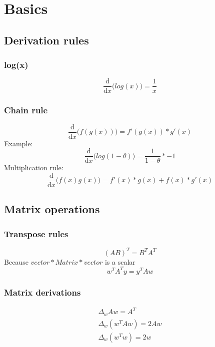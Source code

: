 \section{Basics}
\subsection{Derivation rules}
\subsubsection{log(x)}
\begin{equation}
	\frac{\mathrm{d}}{\mathrm{d} x}\big( log(x) \big) = \frac{1}{x}
\end{equation}
\subsubsection{Chain rule}
\begin{equation}
	\frac{\mathrm{d}}{\mathrm{d} x}\big( f(g(x)) \big) = f'(g(x))*g'(x)
\end{equation}
Example:
\begin{equation}
	\frac{\mathrm{d}}{\mathrm{d} x}\big( log(1-\theta) \big) = \frac{1}{1-\theta}*-
	1
\end{equation}
Multiplication rule:
\begin{equation}
	\frac{\mathrm{d}}{\mathrm{d} x}\big( f(x)g(x) \big) = f'(x)*g(x) + f(x)*g'(x)
\end{equation}
\subsection{Matrix operations}
\subsubsection{Transpose rules}
\begin{equation}
	(AB)^{T}= B^{T}A^{T}
\end{equation}
Because $vector * Matrix * vector$ is a scalar
\begin{equation}
	w^{T}A^{T}y = y^{T}Aw
\end{equation}
\subsubsection{Matrix derivations}
\begin{equation}
	\begin{aligned}
		\Delta_{w}Aw = A^T\\ \Delta_w(w^{T}Aw) = 2Aw\\ \Delta_w(w^{T}w) = 2w\\
	\end{aligned}
\end{equation}